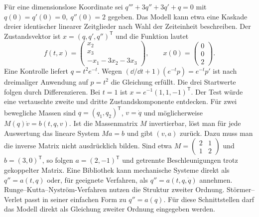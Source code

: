 Für eine dimensionslose Koordinate sei \(q'''+3q''+3q'+q=0\) mit \(q(0)=q'(0)=0,\ q''(0)=2\) gegeben. Das Modell kann etwa eine Kaskade dreier identischer linearer Zeitglieder nach Wahl der Zeiteinheit beschreiben. Der Zustandsvektor ist \(x=(q,q',q'')^\mathsf T\) und die Funktion lautet
\[
 f(t,x)=\begin{pmatrix}x_2\\x_3\\-x_1-3x_2-3x_3\end{pmatrix},
 \qquad x(0)=\begin{pmatrix}0\\0\\2\end{pmatrix}.
\]
Eine Kontrolle liefert \(q=t^2e^{-t}\). Wegen \((\dd/\dd t+1)(e^{-t}p)=e^{-t}p'\) ist nach dreimaliger Anwendung auf \(p=t^2\) die Gleichung erfüllt. Die drei Startwerte folgen durch Differenzieren. Bei \(t=1\) ist \(x=e^{-1}(1,1,-1)^\mathsf T\). Der Test würde eine vertauschte zweite und dritte Zustandskomponente entdecken.
Für zwei bewegliche Massen sind \(q=(q_1,q_2)^\mathsf T\), \(v=\dot q\) und möglicherweise \(M(q)\dot v=b(t,q,v)\). Ist die Massenmatrix \(M\) invertierbar, löst man für jede Auswertung das lineare System \(Ma=b\) und gibt \((v,a)\) zurück. Dazu muss man die inverse Matrix nicht ausdrücklich bilden. Sind etwa \(M=\left(\begin{smallmatrix}2&1\\1&2\end{smallmatrix}\right)\) und \(b=(3,0)^\mathsf T\), so folgen \(a=(2,-1)^\mathsf T\) und getrennte Beschleunigungen trotz gekoppelter Matrix.
Eine Bibliothek kann mechanische Systeme direkt als \(q''=a(t,q)\) oder, für geeignete Verfahren, als \(q''=a(t,q,\dot q)\) annehmen. Runge--Kutta--Nyström-Verfahren nutzen die Struktur zweiter Ordnung. Störmer--Verlet passt in seiner einfachen Form zu \(q''=a(q)\). Für diese Schnittstellen darf das Modell direkt als Gleichung zweiter Ordnung eingegeben werden.

